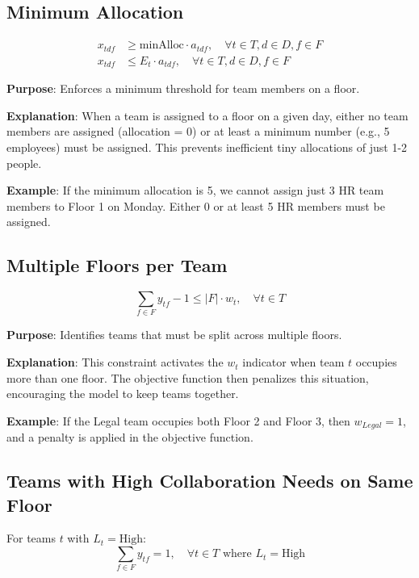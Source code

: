 \documentclass[12pt]{article}
\begin{document}
\subsection{Minimum Allocation}
\begin{align}
x_{tdf} &\geq \text{minAlloc} \cdot a_{tdf}, \quad \forall t \in T, d \in D, f \in F\\
x_{tdf} &\leq E_t \cdot a_{tdf}, \quad \forall t \in T, d \in D, f \in F
\end{align}

\textbf{Purpose}: Enforces a minimum threshold for team members on a floor.

\textbf{Explanation}: When a team is assigned to a floor on a given day, either no team members are assigned (allocation = 0) or at least a minimum number (e.g., 5 employees) must be assigned. This prevents inefficient tiny allocations of just 1-2 people.

\textbf{Example}: If the minimum allocation is 5, we cannot assign just 3 HR team members to Floor 1 on Monday. Either 0 or at least 5 HR members must be assigned.

\subsection{Multiple Floors per Team}
\begin{equation}
\sum_{f \in F} y_{tf} - 1 \leq |F| \cdot w_t, \quad \forall t \in T
\end{equation}

\textbf{Purpose}: Identifies teams that must be split across multiple floors.

\textbf{Explanation}: This constraint activates the $w_t$ indicator when team $t$ occupies more than one floor. The objective function then penalizes this situation, encouraging the model to keep teams together.

\textbf{Example}: If the Legal team occupies both Floor 2 and Floor 3, then $w_{Legal} = 1$, and a penalty is applied in the objective function.

\subsection{Teams with High Collaboration Needs on Same Floor}
For teams $t$ with $L_t = \text{High}$:
\begin{equation}
\sum_{f \in F} y_{tf} = 1, \quad \forall t \in T \text{ where } L_t = \text{High}
\end{equation}
\end{document}
